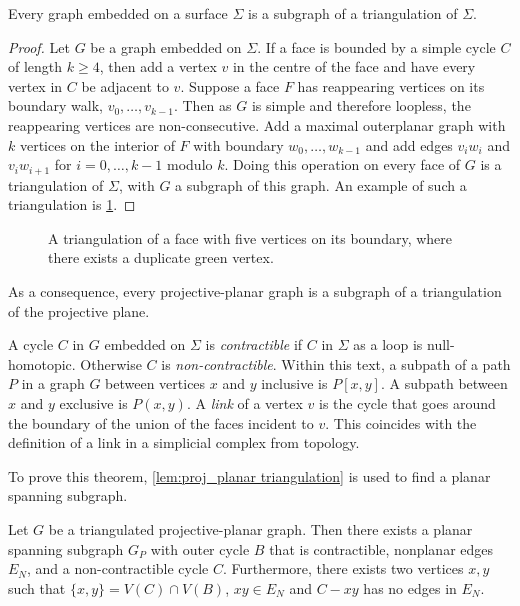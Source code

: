 \begin{theorem}\label{thm:triangulation_subgraph}
    Every graph embedded on a surface $\Sigma$ is a subgraph of a triangulation of $\Sigma$.
\end{theorem}

\begin{proof}
    Let $G$ be a graph embedded on $\Sigma$. If a face is bounded by a simple cycle $C$ of length $k \geq 4$, then add a vertex $v$ in the centre of the face and have every vertex in $C$ be adjacent to $v$. Suppose a face $F$ has reappearing vertices on its boundary walk, $v_0, \ldots, v_{k-1}$. Then as $G$ is simple and therefore loopless, the reappearing vertices are non-consecutive. Add a maximal outerplanar graph with $k$ vertices on the interior of $F$ with boundary $w_0, \ldots, w_{k-1}$ and add edges $v_i w_i$ and $v_i w_{i + 1}$ for $i = 0, \ldots, {k-1}$ modulo $k$. Doing this operation on every face of $G$ is a triangulation of $\Sigma$, with $G$ a subgraph of this graph. An example of such a triangulation is \cref{fig:triangulation}.
\end{proof}
\begin{figure}[h!]
    \centering
    
    \caption[Face triangulation]{A triangulation of a face with five vertices on its boundary, where there exists a duplicate green vertex.}\label{fig:triangulation}
\end{figure}
As a consequence, every projective-planar graph is a subgraph of a triangulation of the projective plane. 

A cycle $C$ in $G$ embedded on $\Sigma$ is \textit{contractible} if $C$ in $\Sigma$ as a loop is null-homotopic. Otherwise $C$ is \textit{ non-contractible}. Within this text, a subpath of a path $P$ in a graph $G$ between vertices $x$ and $y$ inclusive is $P[x, y]$. A subpath between $x$ and $y$ exclusive is $P(x, y)$. 
A \textit{link} of a vertex $v$ is the cycle that goes around the boundary of the union of the faces incident to $v$. This coincides with the definition of a link in a simplicial complex from topology. 

To prove this theorem, \cref{lem:proj_planar triangulation} is used to find a planar spanning subgraph.

\begin{lemma}\label{lem:proj_planar triangulation}
    Let $G$ be a triangulated projective-planar graph. Then there exists a planar spanning subgraph $G_P$ with outer cycle $B$ that is contractible, nonplanar edges $E_N$, and a non-contractible cycle $C$. Furthermore, there exists two vertices $x, y$ such that $\{x, y \} = V(C) \cap V(B)$, $xy \in E_N$ and $C - xy$ has no edges in $E_N$. 
\end{lemma}

